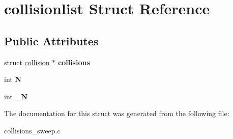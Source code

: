 \hypertarget{structcollisionlist}{
\section{collisionlist Struct Reference}
\label{structcollisionlist}
}
\subsection*{Public Attributes}
\begin{DoxyCompactItemize}
\item 
\hypertarget{structcollisionlist_a54ce4683c6c0c58b88890d97a1f05a11}{
struct \hyperlink{structcollision}{collision} $\ast$ {\bfseries collisions}}
\label{structcollisionlist_a54ce4683c6c0c58b88890d97a1f05a11}

\item 
\hypertarget{structcollisionlist_aa7744751a682917cf8a203f1c1b37241}{
int {\bfseries N}}
\label{structcollisionlist_aa7744751a682917cf8a203f1c1b37241}

\item 
\hypertarget{structcollisionlist_a0f6349dfc9d0df910c1e277672ac1956}{
int {\bfseries \_\-N}}
\label{structcollisionlist_a0f6349dfc9d0df910c1e277672ac1956}

\end{DoxyCompactItemize}


The documentation for this struct was generated from the following file:\begin{DoxyCompactItemize}
\item 
collisions\_\-sweep.c\end{DoxyCompactItemize}

